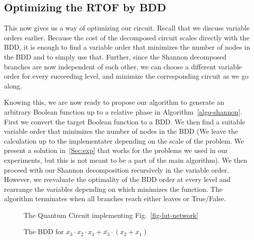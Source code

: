 \subsection{Optimizing the RTOF by BDD}
\label{Subsec:rtof-opt}

This now gives us a way of optimizing our circuit. Recall that we
discuss variable orders earlier. Because the cost of the decomposed
circuit scales directly with the BDD, it is enough to find a variable
order that minimizes the number of nodes in the BDD and to simply use
that. Further, since the Shannon decomposed branches are now
independent of each other, we can choose a different variable order
for every succeeding level, and minimize the corresponding circuit as
we go along.

Knowing this, we are now ready to propose our algorithm to generate an
arbitrary Boolean function up to a relative phase in Algorithm~\ref{algo-shannon}. 
First we convert the target Boolean function to a BDD. We then find a suitable variable order
that minimizes the number of nodes in the BDD (We leave the
calculation up to the implementater depending on the scale of the
problem. We present a solution in~\ref{Sec:exp} that works for the
problems we used in our experiments, but this is not meant to be a
part of the main algorithm). We then proceed with our Shannon
decomposition recursively in the variable order. However, we
reevaluate the optimality of the BDD order at every level and
rearrange the variables depending on which minimizes the function. The
algorithm terminates when all branches reach either leaves or
True/False.


\begin{figure*}[t]
  \begin{minipage}{0.50\linewidth}
    \begin{center}
      \scalebox{1.0} {
        
      }
      \caption{The Quantum Circuit implementing Fig.~\ref{fig-lut-network} }
      \label{fig-lut-qc}
    \end{center}
  \end{minipage}
  \hspace{0.08\linewidth}
  \begin{minipage}{0.40\linewidth}
    \begin{center}
      
      \caption{The BDD for $x_3 \cdot x_2 \cdot x_1 + \bar{x_3} \cdot (x_2 + x_1)$}
      \label{fig-func-bdd}
    \end{center}
  \end{minipage}
\end{figure*}
\vspace*{-0.25cm}
